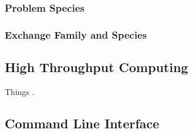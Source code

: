 \subsubsection{Problem Species}
 
\subsubsection{Exchange Family and Species}


\subsection{High Throughput Computing}\label{method:tools:htc}

Things \cite{bui_work_2011} \cite{cde} \cite{condor-practice}.

\subsection{Command Line Interface}
